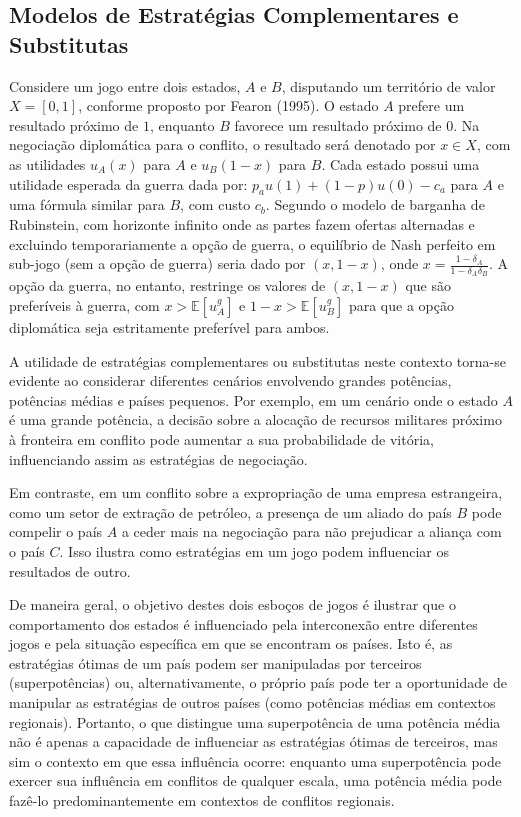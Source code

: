 \documentclass[]{interact}
\theoremstyle{plain}%
\theoremstyle{definition}
\theoremstyle{remark}
\begin{document}
\hypertarget{modelos-de-estratuxe9gias-complementares-e-substitutas}{%
\subsection{Modelos de Estratégias Complementares e
Substitutas}\label{modelos-de-estratuxe9gias-complementares-e-substitutas}}

Considere um jogo entre dois estados, \(A\) e \(B\), disputando um
território de valor \(X = [0,1]\), conforme proposto por Fearon (1995).
O estado \(A\) prefere um resultado próximo de \(1\), enquanto \(B\)
favorece um resultado próximo de \(0\). Na negociação diplomática para o
conflito, o resultado será denotado por \(x \in X\), com as utilidades
\(u_A(x)\) para \(A\) e \(u_B(1-x)\) para \(B\). Cada estado possui uma
utilidade esperada da guerra dada por: \(p_a u(1) + (1-p)u(0) - c_a\)
para \(A\) e uma fórmula similar para \(B\), com custo \(c_b\). Segundo
o modelo de barganha de Rubinstein, com horizonte infinito onde as
partes fazem ofertas alternadas e excluindo temporariamente a opção de
guerra, o equilíbrio de Nash perfeito em sub-jogo (sem a opção de
guerra) seria dado por \((x, 1-x)\), onde
\(x = \frac{1 -\delta_A}{1 - \delta_A \delta_B}\). A opção da guerra, no
entanto, restringe os valores de \((x, 1-x)\) que são preferíveis à
guerra, com \(x > \mathbb{E}[u^g_A]\) e \(1 - x > \mathbb{E}[u^g_B]\)
para que a opção diplomática seja estritamente preferível para ambos.

A utilidade de estratégias complementares ou substitutas neste contexto
torna-se evidente ao considerar diferentes cenários envolvendo grandes
potências, potências médias e países pequenos. Por exemplo, em um
cenário onde o estado \(A\) é uma grande potência, a decisão sobre a
alocação de recursos militares próximo à fronteira em conflito pode
aumentar a sua probabilidade de vitória, influenciando assim as
estratégias de negociação.

Em contraste, em um conflito sobre a expropriação de uma empresa
estrangeira, como um setor de extração de petróleo, a presença de um
aliado do país \(B\) pode compelir o país \(A\) a ceder mais na
negociação para não prejudicar a aliança com o país \(C\). Isso ilustra
como estratégias em um jogo podem influenciar os resultados de outro.

De maneira geral, o objetivo destes dois esboços de jogos é ilustrar que
o comportamento dos estados é influenciado pela interconexão entre
diferentes jogos e pela situação específica em que se encontram os
países. Isto é, as estratégias ótimas de um país podem ser manipuladas
por terceiros (superpotências) ou, alternativamente, o próprio país pode
ter a oportunidade de manipular as estratégias de outros países (como
potências médias em contextos regionais). Portanto, o que distingue uma
superpotência de uma potência média não é apenas a capacidade de
influenciar as estratégias ótimas de terceiros, mas sim o contexto em
que essa influência ocorre: enquanto uma superpotência pode exercer sua
influência em conflitos de qualquer escala, uma potência média pode
fazê-lo predominantemente em contextos de conflitos regionais.
\end{document}
